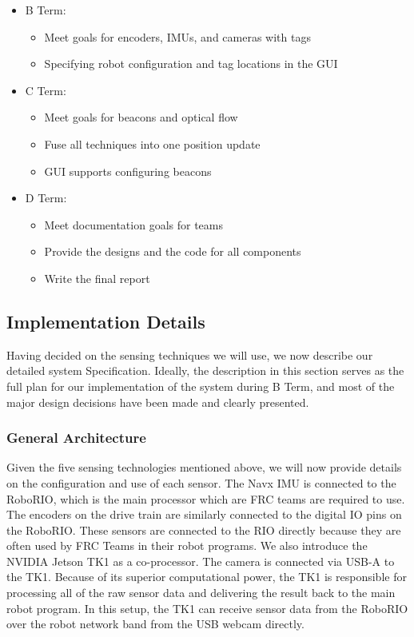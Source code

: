 \documentclass{article}
\begin{document}
    \begin{itemize}
      \item B Term:
      \begin{itemize}
        \item Meet goals for encoders, IMUs, and cameras with tags
        \item Specifying robot configuration and tag locations in the GUI
      \end{itemize}
      \item C Term:
      \begin{itemize}
        \item Meet goals for beacons and optical flow
        \item Fuse all techniques into one position update
        \item GUI supports configuring beacons
      \end{itemize}
      \item D Term:
      \begin{itemize}
        \item Meet documentation goals for teams
        \item Provide the designs and the code for all components
        \item Write the final report
      \end{itemize}
    \end{itemize}

  \subsection{Implementation Details}

    Having decided on the sensing techniques we will use, we now describe our detailed system Specification. Ideally, the description in this section serves as the full plan for our implementation of the system during B Term, and most of the major design decisions have been made and clearly presented.

    \subsubsection{General Architecture}

    Given the five sensing technologies mentioned above, we will now provide details on the configuration and use of each sensor. The Navx IMU is connected to the RoboRIO, which is the main processor which are FRC teams are required to use. The encoders on the drive train are similarly connected to the digital IO pins on the RoboRIO. These sensors are connected to the RIO directly because they are often used by FRC Teams in their robot programs. We also introduce the NVIDIA Jetson TK1 as a co-processor. The camera is connected via USB-A to the TK1. Because of its superior computational power, the TK1 is responsible for processing all of the raw sensor data and delivering the result back to the main robot program. In this setup, the TK1 can receive sensor data from the RoboRIO over the robot network  band from the USB webcam directly.
\end{document}
